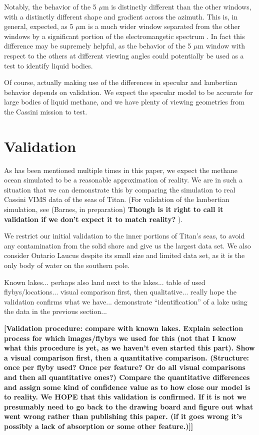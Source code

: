 \documentclass[twocolumn,linenumbers]{aastex631}
\begin{document}
Notably, the behavior of the 5 $\mu$m is distinctly different than the other windows, with a distinctly different shape and gradient across the azimuth. This is, in general, expected, as 5 $\mu$m is a much wider window separated from the other windows by a significant portion of the electromangetic spectrum \citep{EsSayeh2023}. In fact this difference may be supremely helpful, as the behavior of the 5 $\mu$m window with respect to the others at different viewing angles could potentially be used as a test to identify liquid bodies. 

Of course, actually making use of the differences in specular and lambertian behavior depends on validation. We expect the specular model to be accurate for large bodies of liquid methane, and we have plenty of viewing geometries from the Cassini mission to test.

\section{Validation} \label{sec:validation}

As has been mentioned multiple times in this paper, we expect the methane ocean simulated to be a reasonable approximation of reality. We are in such a situation that we can demonstrate this by comparing the simulation to real Cassini VIMS data of the seas of Titan. (For validation of the lambertian simulation, see (Barnes, in preparation) \textbf{\color{red} Though is it right to call it validation if we don't expect it to match reality? \color{black}}). 

We restrict our initial validation to the inner portions of Titan's seas, to avoid any contamination from the solid shore and give us the largest data set. We also consider Ontario Laucus despite its small size and limited data set, as it is the only body of water on the southern pole. 

\color{blue}Known lakes... perhaps also land next to the lakes... table of used flybys/locations... visual comparison first, then qualitative... really hope the validation confirms what we have... demonstrate ``identification'' of a lake using the data in the previous section... \color{black}

\textbf{\color{red}[Validation procedure: compare with known lakes. Explain selection process for which images/flybys we used for this (not that I know what this procedure is yet, as we haven't even started this part). Show a visual comparison first, then a quantitative comparison. (Structure: once per flyby used? Once per feature? Or do all visual comparisons and then all quantitative ones?) Compare the quantitative differences and assign some kind of confidence value as to how close our model is to reality. We HOPE that this validation is confirmed. If it is not we presumably need to go back to the drawing board and figure out what went wrong rather than publishing this paper. (if it goes wrong it's possibly a lack of absorption or some other feature.)]]\color{black}}
\end{document}
